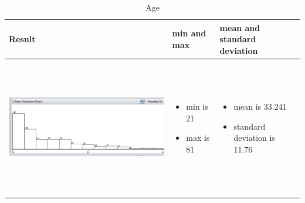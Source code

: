 \documentclass{article}
\begin{document}
\begin{table}[h!]
  \centering
  \begin{tabular}{ | m{5 cm} | m{3cm} | m{3cm} | }
    \hline
   Result &  min and max & mean and standard deviation \\ \hline
    \begin{minipage}{.3\textwidth}
      \includegraphics[width=\linewidth, height=60mm]{age.png}
    \end{minipage}
    &
      \begin{itemize}
        \item  min is 21
        \item max is 81
          
      \end{itemize}
    & 
      \begin{itemize}
        \item  mean is 33.241
        \item  standard deviation is 11.76 
          
      \end{itemize}
    \\ \hline
  \end{tabular}
  \caption{ Age}\label{tbl:myLboro}
\end{table}
\end{document}
